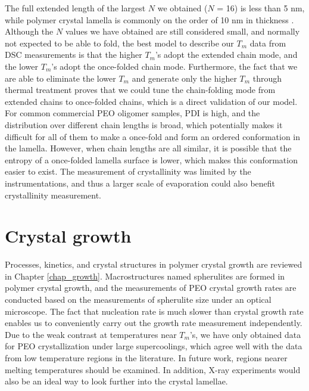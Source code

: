 The full extended length of the largest $N$ we obtained ($N$ = 16) is less than 5 nm, while polymer crystal lamella is commonly on the order of 10 nm in thickness \cite{Savage2015}. Although the $N$ values we have obtained are still considered small, and normally not expected to be able to fold, the best model to describe our $T_{m}$ data from DSC measurements is that the higher $T_{m}$’s adopt the extended chain mode, and the lower $T_{m}$’s adopt the once-folded chain mode. Furthermore, the fact that we are able to eliminate the lower $T_{m}$ and generate only the higher $T_{m}$ through thermal treatment proves that we could tune the chain-folding mode from extended chains to once-folded chains, which is a direct validation of our model. For common commercial PEO oligomer samples, PDI is high, and the distribution over different chain lengths is broad, which potentially makes it difficult for all of them to make a once-fold and form an ordered conformation in the lamella. However, when chain lengths are all similar, it is possible that the entropy of a once-folded lamella surface is lower, which makes this conformation easier to exist. The measurement of crystallinity was limited by the instrumentations, and thus a larger scale of evaporation could also benefit crystallinity measurement.

\section{Crystal growth}

Processes, kinetics, and crystal structures in polymer crystal growth are reviewed in Chapter \ref{chap_growth}. Macrostructures named spherulites are formed in polymer crystal growth, and the measurements of PEO crystal growth rates are conducted based on the measurements of spherulite size under an optical microscope. The fact that nucleation rate is much slower than crystal growth rate enables us to conveniently carry out the growth rate measurement independently. Due to the weak contrast at temperatures near $T_{m}$'s, we have only obtained data for PEO crystallization under large supercoolings, which agree well with the data from low temperature regions in the literature. In future work, regions nearer melting temperatures should be examined. In addition, X-ray experiments would also be an ideal way to look further into the crystal lamellae.